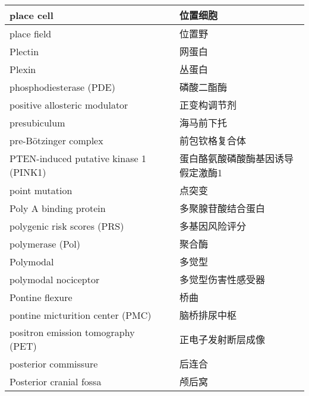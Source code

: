 \begin{longtable}{lll}
	\midrule
	place cell   && 位置细胞   \\
	
	\midrule
	place field   && 位置野   \\
	
	\midrule
	Plectin   && 网蛋白   \\
	
	\midrule
	Plexin   && 丛蛋白   \\
	
	\midrule
	phosphodiesterase (PDE)  && 磷酸二酯酶   \\
	
	\midrule
	positive allosteric modulator   && 正变构调节剂   \\
	
	\midrule
	presubiculum   && 海马前下托   \\
	
	\midrule
	pre-Bötzinger complex   && 前包钦格复合体   \\
	
	\midrule
	PTEN-induced putative kinase 1 (PINK1)     && 蛋白酪氨酸磷酸酶基因诱导假定激酶1   \\
	
	\midrule
	point mutation     && 点突变   \\
	
	\midrule
	Poly A binding protein     && 多聚腺苷酸结合蛋白   \\
	
	\midrule
	polygenic risk scores (PRS)     && 多基因风险评分   \\
	
	\midrule
	polymerase (Pol)     && 聚合酶   \\
	
	\midrule
	Polymodal     && 多觉型   \\
	
	\midrule
	polymodal nociceptor     && 多觉型伤害性感受器   \\
	
	\midrule
	Pontine flexure     && 桥曲   \\
	
	\midrule
	pontine micturition center  (PMC)   && 脑桥排尿中枢   \\
	
	\midrule
	positron emission tomography (PET)     && 正电子发射断层成像   \\
	
	\midrule
	posterior commissure     && 后连合   \\
	
	\midrule
	Posterior cranial fossa     && 颅后窝   \\
	

\end{longtable}
